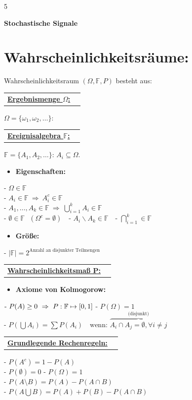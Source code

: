 \documentclass[8pt,a4paper,landscape]{extarticle}
\makeatletter
\newcommand{\CheatsheetItem}[3]{
  \par\vspace*{1pt}
    \item{
      \small\tiny\textbf{#1}{#2 \vspace{7pt}}{#3}
    }
  \par\vspace*{-1pt}\noindent
}
\newcommand{\CheatsheetHeading}[2]{
  \par\vspace*{1pt}\noindent
    \begin{tabular*}{0.99\textwidth}[t]{@{}l@{\extracolsep{\fill}}r}
      {\setulcolor{MyPurple2}\color{MyPurple2}\ul{\textbf{#1}}} \textit{\color{gray}#2} \\
    \end{tabular*}
  \par\vspace*{2pt}\noindent
}
\newcommand{\CheatsheetItemListStart}{\begin{itemize}[leftmargin=*, labelsep=5pt, nosep]}
\newcommand{\CheatsheetItemListEnd}{\end{itemize}\vspace{-5pt}}
\makeatother
\begin{document}
\tiny\color{MyGray}
\setlength{\lineskiplimit}{-\maxdimen}
\linespread{1.2}\selectfont
\begin{multicols*}{5}

{\huge\color{MyPurple1}\textbf{Stochastische Signale}}
\vspace{4pt}
\section*{Wahrscheinlichkeitsräume:}
Wahrscheinlichkeitsraum $(\Omega, \mathbb{F}, P)$ besteht aus:
  
  \CheatsheetHeading{Ergebnismenge $\Omega$: }{}

  $\Omega = \{\omega_1, \omega_2, \dots\}$: 
%
  \CheatsheetHeading{Ereignisalgebra $\mathbb{F}$:}{}

  $\mathbb{F} = \{A_1, A_2, \dots\}$:  $A_i \subseteq \Omega$.
%
    \CheatsheetItemListStart
      \CheatsheetItem{Eigenschaften: }{}{}
    \CheatsheetItemListEnd
%
      $\text{- } \Omega \in \mathbb{F} $ \\
      $\text{- } A_i \in \mathbb{F} \ \Rightarrow \ A_i^c \in \mathbb{F} $ \\
      $\text{- } A_1, \dots, A_k \in \mathbb{F} \ \Rightarrow \ \bigcup_{i=1}^{k} A_i \in \mathbb{F} $ \\
%
      $\text{- }\emptyset \in \mathbb{F} \text{ }(\Omega^c = \emptyset)\text{ }$ 
      $\text{- } A_i\backslash A_k \in \mathbb{F}\text{ }$
      $\text{- } \bigcap_{i = 1}^k \in \mathbb{F}$
%
    \CheatsheetItemListStart
     \CheatsheetItem{Größe: }{}{}
    \CheatsheetItemListEnd 
%
      $\text{- }|\mathbb{F}| \hat{=} 2^{\text{Anzahl an disjunkter Teilmengen}}$ 
%
  \CheatsheetHeading{Wahrscheinlichkeitsmaß P:}{}

%
    \CheatsheetItemListStart
        \CheatsheetItem{Axiome von Kolmogorow:}{}{}
    \CheatsheetItemListEnd
%    
      $\text{- } P(A) \ge 0 \ \Rightarrow \ P: \mathbb{F} \mapsto [0,1] \\$
      $\text{- }P(\Omega) = 1$ \\
      $\text{- }P\left(\bigcup A_i\right) = \sum P(A_i) \quad \text{wenn: } \overbrace{A_i \cap A_j = \emptyset, \forall i \neq j}^{\text{(disjunkt)}}$
%
  \CheatsheetHeading{Grundlegende Rechenregeln:}{}

    $\text{- }P(A^c) = 1 - P(A) $ \\
    $\text{- }P(\emptyset) = 0 $ \hspace{3pt} $\text{- }P(\Omega) = 1 $ \\
    $\text{- }P(A \setminus B) = P(A) - P(A \cap B) $ \\
    $\text{- }P(A \bigcup B) = P(A) + P(B) - P(A \cap B)$ \\
        




\end{multicols*}
\end{document}
